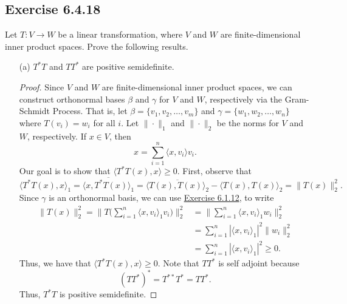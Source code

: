\subsection*{Exercise 6.4.18} Let \( T: V \to W  \) be a linear transformation, where \( V  \) and \( W  \) are finite-dimensional inner product spaces. Prove the following results.
\begin{enumerate}
    \item[(a)] \( T^{*} T \) and \(  T T^{*} \) are positive semidefinite.
        \begin{proof}
            Since \( V  \) and \( W  \) are finite-dimensional inner product spaces, we can construct orthonormal bases \( \beta  \) and \( \gamma \) for \( V  \) and \( W  \), respectively via the Gram-Schmidt Process. That is, let \( \beta = \{ {v}_{1}, {v}_{2}, \dots, {v}_{m} \}  \) and \( \gamma = \{ {w}_{1}, {w}_{2}, \dots, {w}_{n} \}  \) where \( T({v}_{i}) = {w}_{i} \) for all \( i \). Let \( \|\cdot\|_1  \) and \( \|\cdot\|_2 \) be the norms for \( V  \) and \( W  \), respectively. If \( x \in V  \), then 
            \[  x = \sum_{ i=1  }^{ n } \langle x , {v}_{i} \rangle {v}_{i}. \]
            Our goal is to show that \( \langle T^{*}T(x) , x \rangle \geq 0 \). First, observe that
            \[  \langle T^{*}T(x) , x \rangle_1 = \overline{\langle x , T^{*}T(x) \rangle_1} =  \overline{\langle T(x) , T(x) \rangle_2} - \langle T(x) , T(x) \rangle_2 = \|T(x)\|_2^{2}. \]
            Since \( \gamma \) is an orthonormal basis, we can use {\hyperref[Exercise 6.1.12]{Exercise 6.1.12}}, to write
            \begin{align*}
                \|T(x)\|^{2}_2 = \Big\| T \Big(  \sum_{ i=1  }^{ n } \langle x , {v}_{i} \rangle_1 {v}_{i} \Big) \Big\|^{2}_2 &= \Big\| \sum_{ i=1  }^{ n } \langle x , {v}_{i} \rangle_1 {w}_{i} \Big\|^{2}_2 \\
                &= \sum_{ i=1  }^{ n } |\langle x , {v}_{i} \rangle_1|^{2} \|{w}_{i}\|^{2}_2 \\
                &= \sum_{ i=1  }^{ n } | \langle x , {v}_{i} \rangle_1 |^{2} \geq 0.
            \end{align*}
            Thus, we have that \( \langle T^{*}T(x) , x \rangle \geq 0 \). Note that \( T T^{*} \) is self adjoint because  
        \[  (T T^{*})^{*} = T^{**} T^{*} = T T^{*}. \]
        Thus, \( T^{*} T  \) is positive semidefinite.  


\end{proof}
\end{enumerate}
